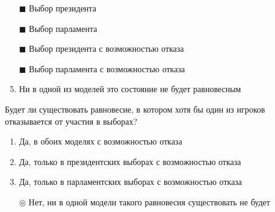 \begin{enumerate}[label=$\square$]
	
	
	
	\item[$\blacksquare$] Выбор президента %
	\item[$\blacksquare$] Выбор парламента
	\item[$\blacksquare$] Выбор президента с возможностью отказа
	\item[$\blacksquare$] Выбор парламента с возможностью отказа
	\item Ни в одной из моделей это состояние не будет равновесным
\end{enumerate}

\solution %

\task Будет ли существовать равновесие, в котором хотя бы один из игроков отказывается от участия в выборах?
\begin{enumerate}[label=$\circ$] %
	\item Да, в обоих моделях с возможностью отказа
	\item Да, только в президентских выборах с возможностью отказа
	\item Да, только в парламентских выборах с возможностью отказа
	\item[$\circledcirc$] Нет, ни в одной модели такого равновесия существовать не будет
\end{enumerate}

\solution %